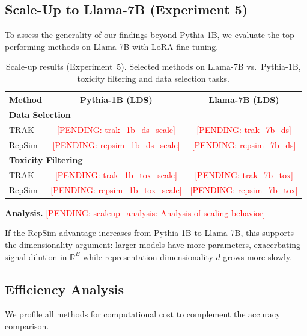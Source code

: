 \documentclass{article}
\newcommand{\pending}[1]{\textcolor{red}{[PENDING: #1]}}
\begin{document}
\subsection{Scale-Up to Llama-7B (Experiment 5)}

To assess the generality of our findings beyond Pythia-1B, we evaluate the top-performing methods on Llama-7B with LoRA fine-tuning.

\begin{table}[t]
    \centering
    \caption{Scale-up results (Experiment~5). Selected methods on Llama-7B vs.\ Pythia-1B, toxicity filtering and data selection tasks.}
    \label{tab:scaleup}
    \small
    \begin{tabular}{lcc}
        \toprule
        Method & Pythia-1B (LDS) & Llama-7B (LDS) \\
        \midrule
        \multicolumn{3}{l}{\textbf{Data Selection}} \\
        TRAK & \pending{trak\_1b\_ds\_scale} & \pending{trak\_7b\_ds} \\
        RepSim & \pending{repsim\_1b\_ds\_scale} & \pending{repsim\_7b\_ds} \\
        \midrule
        \multicolumn{3}{l}{\textbf{Toxicity Filtering}} \\
        TRAK & \pending{trak\_1b\_tox\_scale} & \pending{trak\_7b\_tox} \\
        RepSim & \pending{repsim\_1b\_tox\_scale} & \pending{repsim\_7b\_tox} \\
        \bottomrule
    \end{tabular}
\end{table}

\textbf{Analysis.} \pending{scaleup\_analysis: Analysis of scaling behavior}

If the RepSim advantage increases from Pythia-1B to Llama-7B, this supports the dimensionality argument: larger models have more parameters, exacerbating signal dilution in $\mathbb{R}^B$ while representation dimensionality $d$ grows more slowly.

\subsection{Efficiency Analysis}

We profile all methods for computational cost to complement the accuracy comparison.
\end{document}
